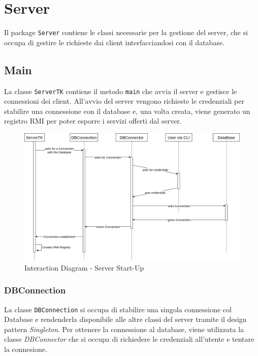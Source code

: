 \section{Server}
Il package \texttt{Server} contiene le classi necessarie per 
la gestione del server, che si occupa di gestire le richieste 
dai client interfacciandosi con il database.

\subsection{Main}
La classe \texttt{ServerTK} contiene il metodo \texttt{main} 
che avvia il server e gestisce le connessioni dei client.
All'avvio del server vengono richieste le credenziali per stabilire 
una connessione con il database e, una volta creata, viene generato un 
registro RMI per poter esporre i servizi offerti dal server.
\begin{figure}[H]
  \centering
  \includegraphics[width=\textwidth]{images/UML-interaction-server.png}
  \caption{Interaction Diagram - Server Start-Up}
  \label{fig:interaction-diagram-server}
\end{figure}

\subsubsection{DBConnection}
La classe \texttt{DBConnection} si occupa di stabilire
una singola connessione col Database e rendenderla disponibile 
alle altre classi del server tramite il design pattern \textit{Singleton}.
Per ottenere la connessione al database, viene utilizzata la classe 
\textit{DBConnector} che si occupa di richiedere le credenziali 
all'utente e tentare la connesione.

